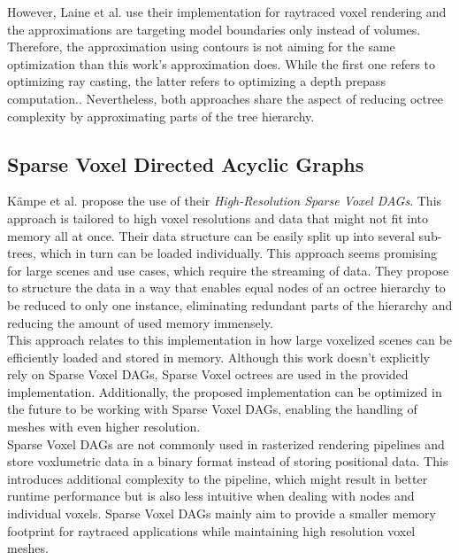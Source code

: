 \noindent
However, Laine et al. use their implementation for raytraced voxel rendering and the approximations are targeting 
model boundaries only instead of volumes. Therefore, the approximation using contours is not aiming for the same 
optimization than this work's approximation does. While the first one refers to optimizing ray casting, the latter 
refers to optimizing a depth prepass computation.. Nevertheless, both approaches share the aspect of reducing 
octree complexity by approximating parts of the tree hierarchy.


\subsection*{Sparse Voxel Directed Acyclic Graphs}

Kämpe et al. \cite{Kampe2013} propose the use of their \emph{High-Resolution Sparse Voxel \ac{DAG}s}. This approach 
is tailored to high voxel resolutions and data that might not fit into memory all at once. Their data structure can 
be easily split up into several sub-trees, which in turn can be loaded individually. This approach seems promising 
for large scenes and use cases, which require the streaming of data. They propose to structure the data in a way that 
enables equal nodes of an octree hierarchy to be reduced to only one instance, eliminating redundant parts of the 
hierarchy and reducing the amount of used memory immensely. \\

\noindent
This approach relates to this implementation in how large voxelized scenes can be efficiently loaded and stored in 
memory. Although this work doesn't explicitly rely on Sparse Voxel \ac{DAG}s, Sparse Voxel octrees are used in the 
provided implementation. Additionally, the proposed implementation can be optimized in the future to be working 
with Sparse Voxel \ac{DAG}s, enabling the handling of meshes with even higher resolution. \\

\noindent
Sparse Voxel \ac{DAG}s are not commonly used in rasterized rendering pipelines and store voxlumetric data in a binary 
format instead of storing positional data. This introduces additional complexity to the pipeline, which might result in 
better runtime performance but is also less intuitive when dealing with nodes and individual voxels. Sparse Voxel 
\ac{DAG}s mainly aim to provide a smaller memory footprint for raytraced applications while maintaining high resolution 
voxel meshes. \\

